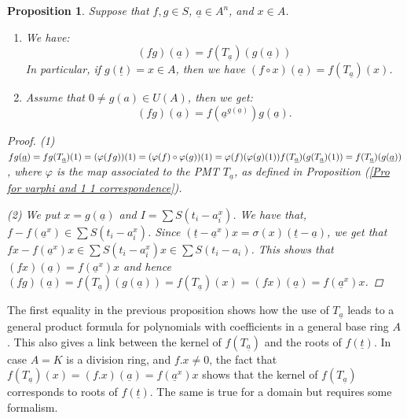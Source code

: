 \documentclass[12pt,a4paper]{article}
\newtheorem{proposition}[theorem]{Proposition}
\newcommand{\ut}{\underline{t}}
\newcommand{\ua}{\underline{a}}
\begin{document}
	\begin{proposition}
		\label{Pro product formula}
		Suppose that $f,g \in S$, $\ua\in A^n$, and $x\in A$.
		\begin{enumerate}
			\item We have:
			$$(fg)(\ua)=f(T_{\ua})(g(\ua))$$   In particular,  if 
			$g(\ut)=x\in A$, then we have $(f\circ x)(\ua)=f(T_{\ua})(x)$.
			\item Assume that $0\ne  g(a) \in U(A) $, then we get:
			$$
			(fg)(\ua)= f(\ua^{g(\ua)})g(\ua).
			$$
		\end{enumerate}
		\begin{proof}
			(1) $fg(\ua)=fg(T_{\ua})(1)=
			(\varphi(fg))(1)=(\varphi(f)\circ\varphi(g))(1)=
			\varphi(f)(\varphi(g)(1))\\
			f(T_{\ua})(g(T_{\ua})(1))=f(T_{\ua})(g(\ua))$, where $\varphi$ is the map associated to the PMT $T_{\ua}$, as defined in Proposition (\ref{Pro for varphi and 1 1 correspondence}). 
			
			(2)   We put $x=g(\ua)$ and $I=\sum S(t_i-a_i^x)$.   We have that, $f-f(\ua^x)\in \sum S(t_i-a_i^x)$.  Since  $(\ut -\ua^x)x=\sigma(x)(\ut-\ua)$, we get that $fx-f(\ua^x)x\in \sum S(t_i-a_i^x)x\in \sum S(t_i-a_i)$.  This shows that  $(fx)(\ua)=f(\ua^x)x$ and hence $(fg)(\ua)=f(T_{\ua})(g(\ua))=f(T_{\ua})(x)=(fx)(\ua)=f(\ua^x)x$. 
		\end{proof}		
	\end{proposition} 
	
	The first equality in the previous proposition shows how the use of $T_{\ua}$ leads to a general product formula for polynomials with coefficients in a general base ring $A$.  This also gives a 
	link between the kernel of $f(T_{\ua})$ and the roots of $f(\ut)$.  In case $A=K$ is a division ring, and $f.x \neq 0 $, the fact that  $f(T_{\ua})(x)=(f.x)(\ua)=f(\ua^x)x$ shows that the kernel of $f(T_{\ua})$ corresponds to roots of $f(\ut)$.  The same is true for a domain but requires some formalism. 
	
\end{document}
